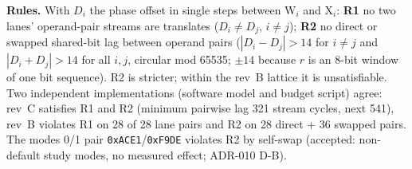 \documentclass[10pt,a4paper]{article}
\begin{document}
\textbf{Rules.} With $D_i$ the phase offset in single steps between W$_i$ and
X$_i$: \textbf{R1} no two lanes' operand-pair streams are translates
($D_i\ne D_j$, $i\ne j$); \textbf{R2} no direct or swapped shared-bit lag
between operand pairs ($|D_i-D_j|>14$ for $i\ne j$ and $|D_i+D_j|>14$ for all
$i,j$, circular mod 65535; $\pm14$ because $r$ is an 8-bit window of one bit
sequence). R2 is stricter; within the rev~B lattice it is unsatisfiable. Two
independent implementations (software model and budget script) agree: rev~C
satisfies R1 and R2 (minimum pairwise lag 321 stream cycles, next 541), rev~B
violates R1 on 28 of 28 lane pairs and R2 on 28 direct + 36 swapped pairs.
The modes 0/1 pair \texttt{0xACE1}/\texttt{0xF9DE} violates R2 by self-swap
(accepted: non-default study modes, no measured effect; ADR-010 D-B).
\end{document}
